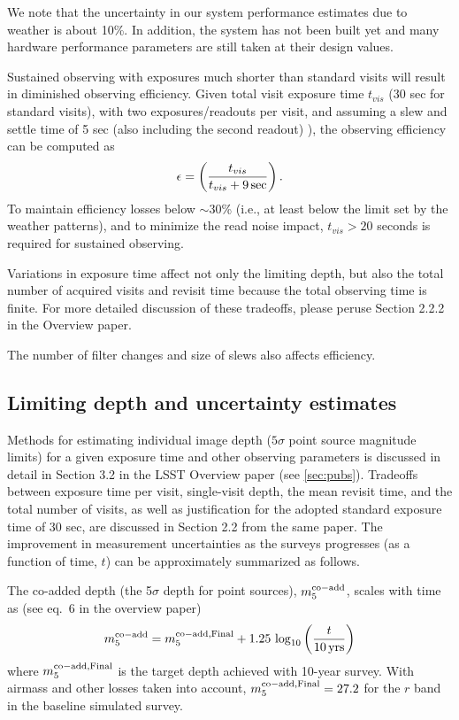 \documentclass[DM,lsstdraft,toc,usenatbib]{lsstdoc}
\begin{document}
We note that the uncertainty in our system performance estimates due to weather is about 10\%.
In addition, the system has not been built yet and many hardware performance parameters are
still taken at their design values.  

Sustained observing with exposures much shorter than standard visits will result
in diminished observing efficiency. Given total visit exposure time $t_{vis}$ (30 sec for standard
visits), with two exposures/readouts per visit, and assuming a slew and settle time of 5 sec 
(also including the second readout) ), the observing efficiency can be computed as 
\begin{equation}
     \epsilon = \left( {t_{vis} \over t_{vis} + 9 \, \mathrm{sec}}\right).
\end{equation}
To maintain efficiency losses below $\sim$30\% (i.e., at least below the limit set by the weather patterns),
and to minimize the read noise impact, $t_{vis} > 20$ seconds is required for sustained observing. 

Variations in exposure time affect not only the limiting depth, but also the total number of 
acquired visits and revisit time because the total observing time is finite. For more detailed 
discussion of these tradeoffs, please peruse Section 2.2.2 in the Overview paper. 

The number of filter changes and size of slews also affects efficiency. 

\subsection{Limiting depth and uncertainty estimates}  

Methods for estimating individual image depth ($5\sigma$ point source magnitude limits) for a given exposure time and other observing parameters
is discussed in detail in Section 3.2 in the LSST Overview paper (see \ref{sec:pubs}). Tradeoffs between 
exposure time per visit, single-visit depth, the mean revisit time, and the total number of visits,
as well as justification for the adopted standard exposure time of 30 sec, are discussed in Section 
2.2 from the same paper. The improvement in measurement uncertainties as the surveys progresses
(as a function of time, $t$) can be approximately summarized as follows. 

The co-added depth (the 5$\sigma$ depth for point sources), $m_5^{\rm co-add}$, scales 
with time as (see eq.~6 in the overview paper)  
\begin{equation} 
         m_5^{\rm co-add}  = m_5^{\rm co-add, Final}  + 1.25 \, \log_{10}\left({t \over 10 \, {\rm yrs}}\right) 
\end{equation} 
where $m_5^{\rm co-add, Final}$ is the target depth achieved with 10-year survey. With
airmass and other losses taken into account, $m_5^{\rm co-add, Final}=27.2$ for the $r$ band
in the baseline simulated survey. 
\end{document}
